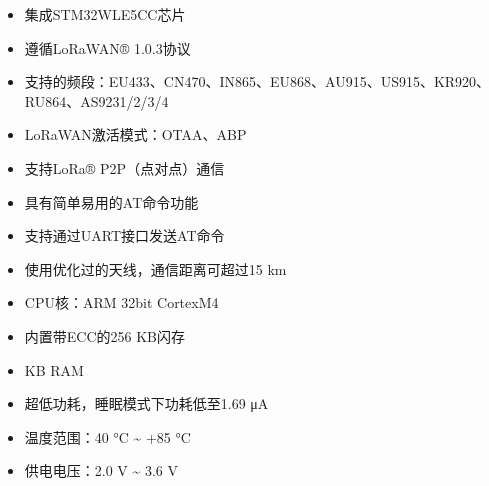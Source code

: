 \documentclass[a4paper,12pt,english]{sphinxmanual}
\begin{document}
\sphinxAtStartPar
{}
\begin{itemize}
\item {} 
\sphinxAtStartPar
集成STM32WLE5CC芯片

\item {} 
\sphinxAtStartPar
遵循LoRaWAN® 1.0.3协议

\item {} 
\sphinxAtStartPar
支持的频段：EU433、CN470、IN865、EU868、AU915、US915、KR920、RU864、AS923\sphinxhyphen{}1/2/3/4

\item {} 
\sphinxAtStartPar
LoRaWAN激活模式：OTAA、ABP

\item {} 
\sphinxAtStartPar
支持LoRa® P2P（点对点）通信

\item {} 
\sphinxAtStartPar
具有简单易用的AT命令功能

\item {} 
\sphinxAtStartPar
支持通过UART接口发送AT命令

\item {} 
\sphinxAtStartPar
使用优化过的天线，通信距离可超过15 km

\item {} 
\sphinxAtStartPar
CPU核：ARM 32\sphinxhyphen{}bit Cortex\sphinxhyphen{}M4

\item {} 
\sphinxAtStartPar
内置带ECC的256 KB闪存

\item {} 
 KB RAM

\item {} 
\sphinxAtStartPar
超低功耗，睡眠模式下功耗低至1.69 μA

\item {} 
\sphinxAtStartPar
温度范围：\sphinxhyphen{}40 °C \textasciitilde{} +85 °C

\item {} 
\sphinxAtStartPar
供电电压：2.0 V \textasciitilde{} 3.6 V

\end{itemize}

\sphinxAtStartPar
{}

\sphinxAtStartPar
{}

\sphinxAtStartPar
{}

\sphinxAtStartPar
{}
\end{document}
